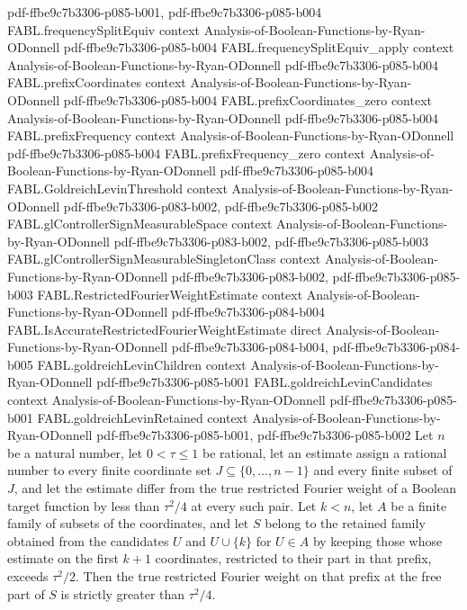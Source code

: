 \begin{theorem}
  {pdf-ffbe9c7b3306-p085-b001,
    pdf-ffbe9c7b3306-p085-b004}
\proofstep
  {FABL.frequencySplitEquiv}
  {context}
  {Analysis-of-Boolean-Functions-by-Ryan-ODonnell}
  {pdf-ffbe9c7b3306-p085-b004}
\proofstep
  {FABL.frequencySplitEquiv_apply}
  {context}
  {Analysis-of-Boolean-Functions-by-Ryan-ODonnell}
  {pdf-ffbe9c7b3306-p085-b004}
\proofstep
  {FABL.prefixCoordinates}
  {context}
  {Analysis-of-Boolean-Functions-by-Ryan-ODonnell}
  {pdf-ffbe9c7b3306-p085-b004}
\proofstep
  {FABL.prefixCoordinates_zero}
  {context}
  {Analysis-of-Boolean-Functions-by-Ryan-ODonnell}
  {pdf-ffbe9c7b3306-p085-b004}
\proofstep
  {FABL.prefixFrequency}
  {context}
  {Analysis-of-Boolean-Functions-by-Ryan-ODonnell}
  {pdf-ffbe9c7b3306-p085-b004}
\proofstep
  {FABL.prefixFrequency_zero}
  {context}
  {Analysis-of-Boolean-Functions-by-Ryan-ODonnell}
  {pdf-ffbe9c7b3306-p085-b004}
\proofstep
  {FABL.GoldreichLevinThreshold}
  {context}
  {Analysis-of-Boolean-Functions-by-Ryan-ODonnell}
  {pdf-ffbe9c7b3306-p083-b002,
    pdf-ffbe9c7b3306-p085-b002}
\proofstep
  {FABL.glControllerSignMeasurableSpace}
  {context}
  {Analysis-of-Boolean-Functions-by-Ryan-ODonnell}
  {pdf-ffbe9c7b3306-p083-b002,
    pdf-ffbe9c7b3306-p085-b003}
\proofstep
  {FABL.glControllerSignMeasurableSingletonClass}
  {context}
  {Analysis-of-Boolean-Functions-by-Ryan-ODonnell}
  {pdf-ffbe9c7b3306-p083-b002,
    pdf-ffbe9c7b3306-p085-b003}
\proofstep
  {FABL.RestrictedFourierWeightEstimate}
  {context}
  {Analysis-of-Boolean-Functions-by-Ryan-ODonnell}
  {pdf-ffbe9c7b3306-p084-b004}
\proofstep
  {FABL.IsAccurateRestrictedFourierWeightEstimate}
  {direct}
  {Analysis-of-Boolean-Functions-by-Ryan-ODonnell}
  {pdf-ffbe9c7b3306-p084-b004,
    pdf-ffbe9c7b3306-p084-b005}
\proofstep
  {FABL.goldreichLevinChildren}
  {context}
  {Analysis-of-Boolean-Functions-by-Ryan-ODonnell}
  {pdf-ffbe9c7b3306-p085-b001}
\proofstep
  {FABL.goldreichLevinCandidates}
  {context}
  {Analysis-of-Boolean-Functions-by-Ryan-ODonnell}
  {pdf-ffbe9c7b3306-p085-b001}
\proofstep
  {FABL.goldreichLevinRetained}
  {context}
  {Analysis-of-Boolean-Functions-by-Ryan-ODonnell}
  {pdf-ffbe9c7b3306-p085-b001,
    pdf-ffbe9c7b3306-p085-b002}
Let $n$ be a natural number, let $0<\tau\leq 1$ be rational, let an estimate assign a
rational number to every finite coordinate set $J\subseteq\{0,\ldots,n-1\}$ and every
finite subset of $J$, and let the estimate differ from the true restricted Fourier
weight of a Boolean target function by less than $\tau^2/4$ at every such pair. Let
$k<n$, let $A$ be a finite family of subsets of the coordinates, and let $S$ belong to
the retained family obtained from the candidates $U$ and $U\cup\{k\}$ for $U\in A$ by
keeping those whose estimate on the first $k+1$ coordinates, restricted to their part in
that prefix, exceeds $\tau^2/2$. Then the true restricted Fourier weight on that prefix
at the free part of $S$ is strictly greater than $\tau^2/4$.
\end{theorem}

